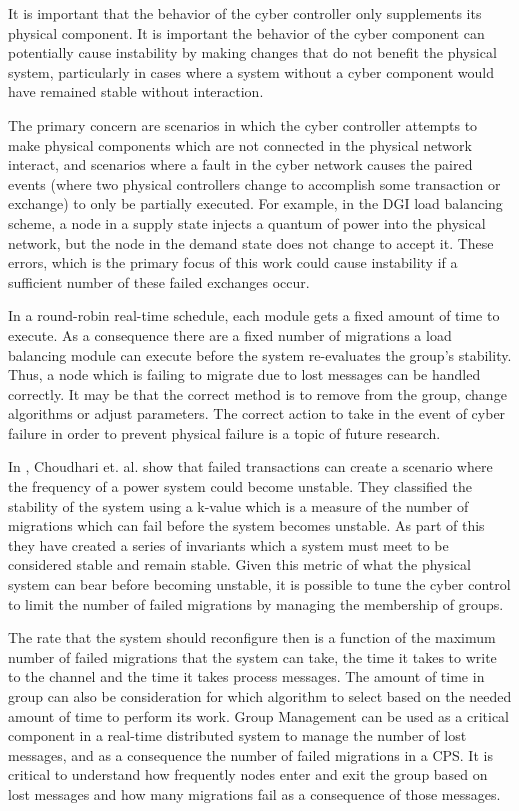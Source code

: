 It is important that the behavior of the cyber controller only supplements its physical component. It is important the behavior of the cyber component can potentially cause instability by making changes that do not benefit the physical system, particularly in cases where a system without a cyber component would have remained stable without interaction.

The primary concern are scenarios in which the cyber controller attempts to make physical components which are not connected in the physical network interact, and scenarios where a fault in the cyber network causes the paired events (where two physical controllers change to accomplish some transaction or exchange) to only be partially executed. For example, in the DGI load balancing scheme, a node in a supply state injects a quantum of power into the physical network, but the node in the demand state does not change to accept it. These errors, which is the primary focus of this work could cause instability if a sufficient number of these failed exchanges occur.

In a round-robin real-time schedule, each module gets a fixed amount of time to execute. As a consequence there are a fixed number of migrations a load balancing module can execute before the system re-evaluates the group's stability. Thus, a node which is failing to migrate due to lost messages can be handled correctly. It may be that the correct method is to remove from the group, change algorithms or adjust parameters. The correct action to take in the event of cyber failure in order to prevent physical failure is a topic of future research.

In \cite{HARINI}, Choudhari et. al. show that failed transactions can create a scenario where the frequency of a power system could become unstable. They classified the stability of the system using a k-value which is a measure of the number of migrations which can fail before the system becomes unstable. As part of this they have created a series of invariants which a system must meet to be considered stable and remain stable. Given this metric of what the physical system can bear before becoming unstable, it is possible to tune the cyber control to limit the number of failed migrations by managing the membership of groups.

The rate that the system should reconfigure then is a function of the maximum number of failed migrations that the system can take, the time it takes to write to the channel and the time it takes process messages. The amount of time in group can also be consideration for which algorithm to select based on the needed amount of time to perform its work. Group Management can be used as a critical component in a real-time distributed system to manage the number of lost messages, and as a consequence the number of failed migrations in a CPS. It is critical to understand how frequently nodes enter and exit the group based on lost messages and how many migrations fail as a consequence of those messages.


